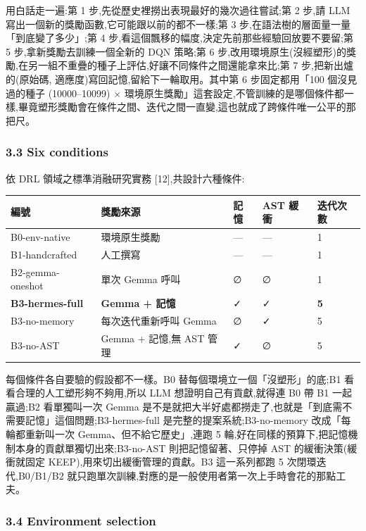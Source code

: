 用白話走一遍:第 1 步,先從歷史裡撈出表現最好的幾次過往嘗試;第 2 步,請 LLM 寫出一個新的獎勵函數,它可能跟以前的都不一樣;第 3 步,在語法樹的層面量一量「到底變了多少」;第 4 步,看這個飄移的幅度,決定先前那些經驗回放要不要留;第 5 步,拿新獎勵去訓練一個全新的 DQN 策略;第 6 步,改用環境原生(沒經塑形)的獎勵,在另一組不重疊的種子上評估,好讓不同條件之間還能拿來比;第 7 步,把新出爐的(原始碼, 適應度)寫回記憶,留給下一輪取用。其中第 6 步固定都用「100 個沒見過的種子 (10000--10099) × 環境原生獎勵」這套設定,不管訓練的是哪個條件都一樣,畢竟塑形獎勵會在條件之間、迭代之間一直變,這也就成了跨條件唯一公平的那把尺。

\subsubsection{3.3 Six conditions}\label{33-six-conditions}

依 DRL 領域之標準消融研究實務 {[}12{]},共設計六種條件:

{\def\LTcaptype{none} %
\begin{longtable}[]{@{}lllll@{}}
\toprule\noalign{}
編號 & 獎勵來源 & 記憶 & AST 緩衝 & 迭代次數 \\
\midrule\noalign{}
\endhead
\bottomrule\noalign{}
\endlastfoot
B0-env-native & 環境原生獎勵 & --- & --- & 1 \\
B1-handcrafted & 人工撰寫 & --- & --- & 1 \\
B2-gemma-oneshot & 單次 Gemma 呼叫 & ∅ & ∅ & 1 \\
\textbf{B3-hermes-full} & \textbf{Gemma + 記憶} & ✓ & ✓ & \textbf{5} \\
B3-no-memory & 每次迭代重新呼叫 Gemma & ∅ & ✓ & 5 \\
B3-no-AST & Gemma + 記憶,無 AST 管理 & ✓ & ∅ & 5 \\
\end{longtable}
}

每個條件各自要驗的假設都不一樣。B0 替每個環境立一個「沒塑形」的底;B1 看看合理的人工塑形夠不夠用,所以 LLM 想證明自己有貢獻,就得連 B0 帶 B1 一起贏過;B2 看單獨叫一次 Gemma 是不是就把大半好處都撈走了,也就是「到底需不需要記憶」這個問題;B3-hermes-full 是完整的提案系統;B3-no-memory 改成「每輪都重新叫一次 Gemma、但不給它歷史」,連跑 5 輪,好在同樣的預算下,把記憶機制本身的貢獻單獨切出來;B3-no-AST 則把記憶留著、只停掉 AST 的緩衝決策(緩衝就固定 KEEP),用來切出緩衝管理的貢獻。B3 這一系列都跑 5 次閉環迭代,B0/B1/B2 就只跑單次訓練,對應的是一般使用者第一次上手時會花的那點工夫。

\subsubsection{3.4 Environment selection}\label{34-environment-selection}


